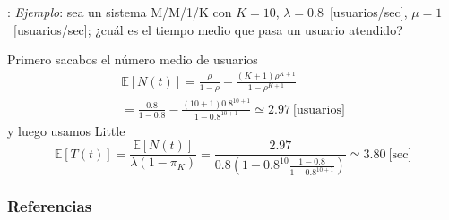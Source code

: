 \documentclass[xcolor={x11names}]{beamer}
\begin{document}
\begin{frame}{\secname: \subsecname}
    \textit{Ejemplo}: sea un sistema
    M/M/1/K con $K=10$,
    $\lambda=0.8$~[usuarios/sec],
    $\mu=1$~[usuarios/sec];
    ¿cuál es el tiempo medio que pasa
    un usuario atendido?
    \vfill
    
    Primero sacabos el número medio
    de usuarios
    \begin{multline*}
        \mathbb{E}[N(t)]=
        \frac{\rho}{1-\rho}-
        \frac{(K+1)\rho^{K+1}}{1-\rho^{K+1}}\\
        =\frac{0.8}{1-0.8}-
        \frac{(10+1)0.8^{10+1}}{1-0.8^{10+1}}
        \simeq2.97~\text{[usuarios]}
    \end{multline*}
    y luego usamos Little
    \begin{equation*}
        \mathbb{E}[T(t)]=
        \frac{\mathbb{E}[N(t)]}{\lambda(1-\pi_K)}
        = \frac{2.97}{0.8
        \left( 1- 0.8^{10}\frac{1-0.8}{1-0.8^{10+1}} \right)
        }
        \simeq 3.80~\text{[sec]}
    \end{equation*}
\end{frame}





\begin{frame}[allowframebreaks]
        \frametitle{Referencias}
        
        
\end{frame}
\end{document}
